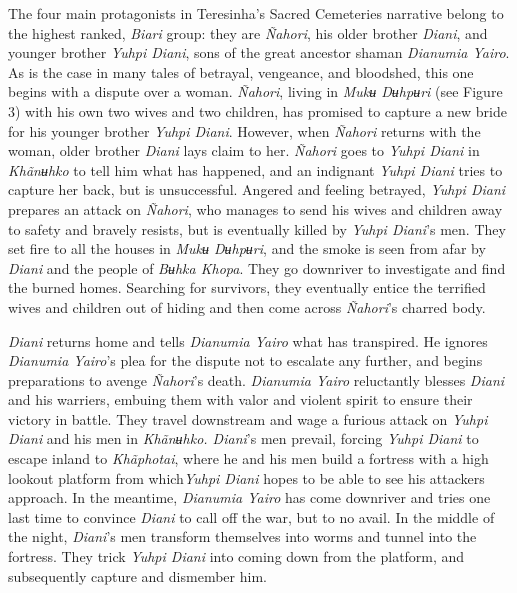 \documentclass[output=paper,
modfonts,nonflat
]{langsci/langscibook}
\begin{document}
The four main protagonists in Teresinha’s Sacred Cemeteries narrative belong to the highest ranked, \textit{Biari} group: they are \textit{Ñahori}, his older brother \textit{Diani}, and younger brother \textit{Yuhpi Diani}, sons of the great ancestor shaman \textit{Dianumia Yairo}. As is the case in many tales of betrayal, vengeance, and bloodshed, this one begins with a dispute over a woman. \textit{Ñahori}, living in \textit{Mukʉ Dʉhpʉri} (see Figure 3) with his own two wives and two children, has promised to capture a new bride for his younger brother \textit{Yuhpi Diani}. However, when \textit{Ñahori} returns with the woman, older brother \textit{Diani} lays claim to her. \textit{Ñahori} goes to \textit{Yuhpi Diani} in \textit{Khãnʉhko} to tell him what has happened, and an indignant \textit{Yuhpi Diani} tries to capture her back, but is unsuccessful. Angered and feeling betrayed, \textit{Yuhpi Diani} prepares an attack on \textit{Ñahori}, who manages to send his wives and children away to safety and bravely resists, but is eventually killed by \textit{Yuhpi Diani}’s men. They set fire to all the houses in \textit{Mukʉ Dʉhpʉri}, and the smoke is seen from afar by \textit{Diani} and the people of \textit{Bʉhka Khopa}. They go downriver to investigate and find the burned homes. Searching for survivors, they eventually entice the terrified wives and children out of hiding and then come across \textit{Ñahori}’s charred body. 

\largerpage
\textit{Diani} returns home and tells \textit{Dianumia Yairo} what has transpired. He ignores \textit{Dianumia Yairo}’s plea for the dispute not to escalate any further, and begins preparations to avenge \textit{Ñahori}’s death. \textit{Dianumia Yairo} reluctantly blesses \textit{Diani} and his warriers, embuing them with valor and violent spirit to ensure their victory in battle. They travel downstream and wage a furious attack on \textit{Yuhpi Diani} and his men in \textit{Khãnʉhko. Diani}’s men prevail, forcing \textit{Yuhpi Diani} to escape inland to \textit{Khãphotai}, where he and his men build a fortress with a high lookout platform from which\textit{Yuhpi Diani} hopes to be able to see his attackers approach. In the meantime, \textit{Dianumia Yairo} has come downriver and tries one last time to convince \textit{Diani} to call off the war, but to no avail. In the middle of the night, \textit{Diani}’s men transform themselves into worms and tunnel into the fortress. They trick \textit{Yuhpi Diani} into coming down from the platform, and subsequently capture and dismember him.
\end{document}
